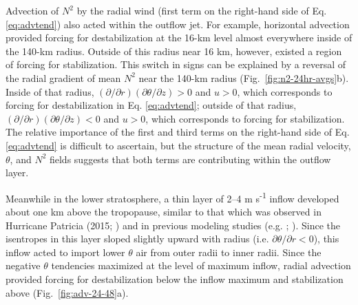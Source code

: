 \documentclass{ametsoc}
\begin{document}
Advection of $N^2$ by the radial wind (first term on the right-hand side of Eq. \ref{eq:advtend}) also acted within the outflow jet.
For example, horizontal advection provided forcing for destabilization at the 16-km level almost everywhere inside of the 140-km radius.
Outside of this radius near 16 km, however, existed a region of forcing for stabilization.
This switch in signs can be explained by a reversal of the radial gradient of mean $N^2$ near the 140-km radius (Fig.~\ref{fig:n2-24hr-avgs}b).
Inside of that radius, $(\partial/\partial r)(\partial \theta/\partial z) > 0$ and $u > 0$, which corresponds to forcing for destabilization in Eq. \ref{eq:advtend}; outside of that radius, $(\partial/\partial r)(\partial \theta/\partial z) < 0$ and $u > 0$, which corresponds to forcing for stabilization.
%
The relative importance of the first and third terms on the right-hand side of Eq. \ref{eq:advtend} is difficult to ascertain, but the structure of the mean radial velocity, $\theta$, and $N^2$ fields suggests that both terms are contributing within the outflow layer.

Meanwhile in the lower stratosphere, a thin layer of 2--4 m s\textsuperscript{-1} inflow developed about one km above the tropopause, similar to that which was observed in Hurricane Patricia (2015; \citeauthor{DuranMolinari2018} \citeyear{DuranMolinari2018}) and in previous modeling studies (e.g. \citeauthor{OhnoSatoh2015} \citeyear{OhnoSatoh2015}; \citeauthor{Kieuetal} \citeyear{Kieuetal}).
Since the isentropes in this layer sloped slightly upward with radius (i.e. $\partial \theta/\partial r < 0$), this inflow acted to import lower $\theta$ air from outer radii to inner radii.
Since the negative $\theta$ tendencies maximized at the level of maximum inflow, radial advection provided forcing for  destabilization below the inflow maximum and stabilization above (Fig.~\ref{fig:adv-24-48}a).
\end{document}
